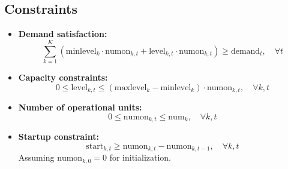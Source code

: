 \documentclass{article}
\begin{document}
\subsection*{Constraints}
\begin{itemize}
    \item \textbf{Demand satisfaction:}
    \[
    \sum_{k=1}^{K} \left( \text{minlevel}_k \cdot \text{numon}_{k,t} + \text{level}_{k,t} \cdot \text{numon}_{k,t} \right) \geq \text{demand}_t, \quad \forall t
    \]

    \item \textbf{Capacity constraints:}
    \[
    0 \leq \text{level}_{k,t} \leq \left( \text{maxlevel}_k - \text{minlevel}_k \right) \cdot \text{numon}_{k,t}, \quad \forall k, t
    \]

    \item \textbf{Number of operational units:}
    \[
    0 \leq \text{numon}_{k,t} \leq \text{num}_k, \quad \forall k, t
    \]

    \item \textbf{Startup constraint:}
    \[
    \text{start}_{k,t} \geq \text{numon}_{k,t} - \text{numon}_{k,t-1}, \quad \forall k, t
    \]
    \quad Assuming \( \text{numon}_{k,0} = 0 \) for initialization.
\end{itemize}
\end{document}
